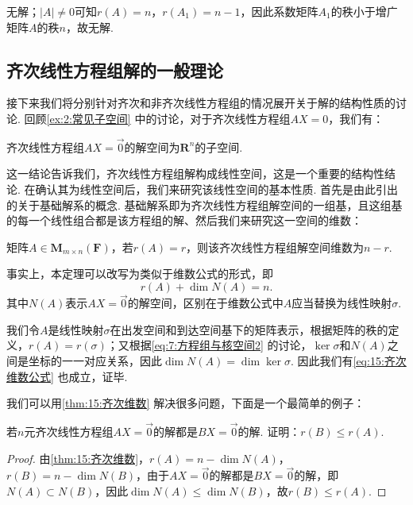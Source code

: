 \begin{solution}
    无解；$|A|\neq 0$可知$r(A)=n$，$r(A_1)=n-1$，因此系数矩阵$A_1$的秩小于增广矩阵$A$的秩$n$，故无解.
\end{solution}

\subsection{齐次线性方程组解的一般理论}

接下来我们将分别针对齐次和非齐次线性方程组的情况展开关于解的结构性质的讨论. 回顾\autoref{ex:2:常见子空间} 中的讨论，对于齐次线性方程组$AX=0$，我们有：
\begin{theorem}
    齐次线性方程组$AX=\vec{0}$的解空间为$\mathbf{R}^n$的子空间.
\end{theorem}
这一结论告诉我们，齐次线性方程组解构成线性空间，这是一个重要的结构性结论. 在确认其为线性空间后，我们来研究该线性空间的基本性质. 首先是由此引出的关于基础解系的概念. 基础解系即为齐次线性方程组解空间的一组基，且这组基的每一个线性组合都是该方程组的解、然后我们来研究这一空间的维数：
\begin{theorem}\label{thm:15:齐次维数}
    矩阵$A \in \mathbf{M}_{m \times n}(\mathbf{F})$，若$r(A) = r$，则该齐次线性方程组解空间维数为$n - r$.
\end{theorem}
事实上，本定理可以改写为类似于维数公式的形式，即
\begin{equation}\label{eq:15:齐次维数公式}
    r(A) + \dim N(A) = n.
\end{equation}
其中$N(A)$表示$AX=\vec{0}$的解空间，区别在于维数公式中$A$应当替换为线性映射$\sigma$.

我们令$A$是线性映射$\sigma$在出发空间和到达空间基下的矩阵表示，根据矩阵的秩的定义，$r(A)=r(\sigma)$；又根据\autoref{eq:7:方程组与核空间2} 的讨论，$\ker\sigma$和$N(A)$之间是坐标的一一对应关系，因此$\dim N(A)=\dim\ker\sigma$. 因此我们有\autoref{eq:15:齐次维数公式} 也成立，证毕.

我们可以用\autoref{thm:15:齐次维数} 解决很多问题，下面是一个最简单的例子：
\begin{example}
    若$n$元齐次线性方程组$AX = \vec{0}$的解都是$BX = \vec{0}$的解. 证明：$r(B) \leqslant r(A)$.
\end{example}

\begin{proof}
    由\autoref{thm:15:齐次维数}，$r(A)=n-\dim N(A)$，$r(B)=n-\dim N(B)$，由于$AX=\vec{0}$的解都是$BX=\vec{0}$的解，即$N(A) \subset N(B)$，因此$\dim N(A) \leqslant \dim N(B)$，故$r(B) \leqslant r(A)$.
\end{proof}

